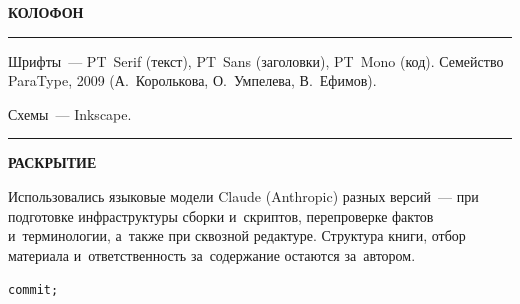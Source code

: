 
\cleardoublepage
\thispagestyle{empty}
\null\vfill
\begin{center}
  \begin{minipage}{0.72\textwidth}
    \centering
    \footnotesize
    \setlength{\parskip}{0.6em}
    \setlength{\parindent}{0pt}

    \textbf{\MakeUppercase{Колофон}}

    \rule{0.18\textwidth}{0.4pt}

    Шрифты~--- PT~Serif (текст), PT~Sans (заголовки), PT~Mono (код). Семейство
    ParaType, 2009 (А.~Королькова, О.~Умпелева, В.~Ефимов).

    Схемы~--- Inkscape.

    \rule{0.18\textwidth}{0.4pt}

    \textbf{\MakeUppercase{Раскрытие}}

    Использовались языковые модели Claude (Anthropic) разных версий~--- при
    подготовке инфраструктуры сборки и~скриптов, перепроверке фактов
    и~терминологии, а~также при сквозной редактуре. Структура книги, отбор
    материала и~ответственность за~содержание остаются за~автором.

    \vspace{0.4em}

    \texttt{commit;}
  \end{minipage}
\end{center}
\vspace*{2em}
\clearpage
